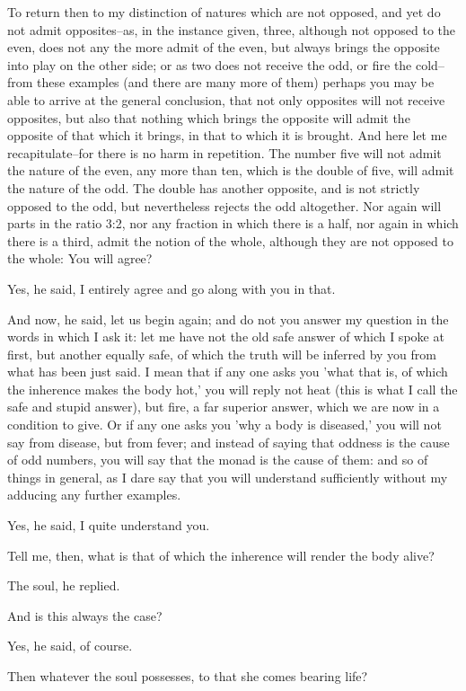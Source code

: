 To return then to my distinction of natures which are not opposed, and
yet do not admit opposites--as, in the instance given, three, although
not opposed to the even, does not any the more admit of the even, but
always brings the opposite into play on the other side; or as two does
not receive the odd, or fire the cold--from these examples (and there
are many more of them) perhaps you may be able to arrive at the general
conclusion, that not only opposites will not receive opposites, but also
that nothing which brings the opposite will admit the opposite of
that which it brings, in that to which it is brought. And here let me
recapitulate--for there is no harm in repetition. The number five will
not admit the nature of the even, any more than ten, which is the
double of five, will admit the nature of the odd. The double has another
opposite, and is not strictly opposed to the odd, but nevertheless
rejects the odd altogether. Nor again will parts in the ratio 3:2, nor
any fraction in which there is a half, nor again in which there is a
third, admit the notion of the whole, although they are not opposed to
the whole: You will agree?

Yes, he said, I entirely agree and go along with you in that.

And now, he said, let us begin again; and do not you answer my question
in the words in which I ask it: let me have not the old safe answer of
which I spoke at first, but another equally safe, of which the truth
will be inferred by you from what has been just said. I mean that if any
one asks you 'what that is, of which the inherence makes the body
hot,' you will reply not heat (this is what I call the safe and
stupid answer), but fire, a far superior answer, which we are now in a
condition to give. Or if any one asks you 'why a body is diseased,' you
will not say from disease, but from fever; and instead of saying that
oddness is the cause of odd numbers, you will say that the monad is the
cause of them: and so of things in general, as I dare say that you will
understand sufficiently without my adducing any further examples.

Yes, he said, I quite understand you.

Tell me, then, what is that of which the inherence will render the body
alive?

The soul, he replied.

And is this always the case?

Yes, he said, of course.

Then whatever the soul possesses, to that she comes bearing life?

